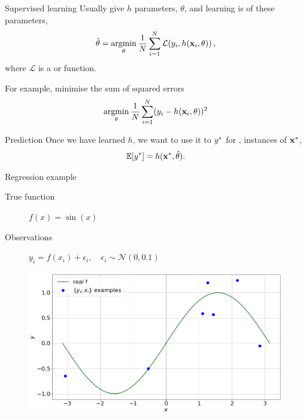 \documentclass[lualatex, aspectratio=169]{beamer}
\begin{document}
\begin{frame}{Supervised learning}
  Usually give $h$ parameters, $\theta$, and learning is  of these parameters,
  \begin{align*}
    \hat{\theta} = \argmin_\theta \frac{1}{N} \sum^N_{i=1} \mathcal{L}\!\left(y_i, h(\v{x}_i, \theta)\right),
  \end{align*}
  where $\mathcal{L}$ is a  or  function.

  \pause
  
  \hspace{1cm}

  For example, minimise the sum of squared errors
  \begin{align*}
    \argmin_{\theta} \frac{1}{N} \sum^N_{i=1} (y_i - h(\v{x}_i, \theta))^2
  \end{align*}

\end{frame}


\begin{frame}{Prediction}
  Once we have learned $h$, we want to use it to  ${y}^{*}$ for ,  instances of ${\mathbf{x}}^{*}$,
  \begin{align*}
    \mathbb{E}\!\left[{{y}^{*}}\right] = h({\mathbf{x}}^{*}, \hat{\theta}).
  \end{align*}
\end{frame}


\begin{frame}{Regression example}

  \begin{description}
    \item[True function] $f(x) = \sin(x)$
    \item[Observations] $y_i = f(x_i) + \epsilon_i, \quad \epsilon_i \sim \mathcal{N}(0, 0.1)$
  \end{description}

  \begin{figure}
    \includegraphics[width=0.6\pagewidth]{assets/regress.png}
  \end{figure}

\end{frame}
\end{document}
